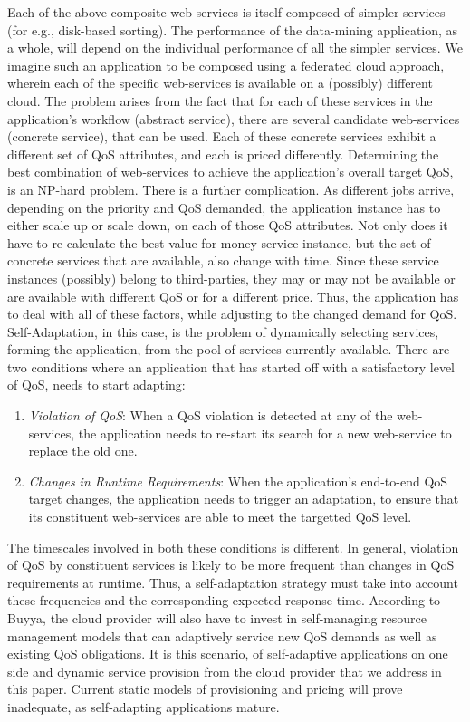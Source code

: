 \documentclass[10pt,journal,compsoc]{IEEEtran}
\begin{document}
Each of the above composite web-services is itself composed of simpler services (for e.g., disk-based sorting). The performance of the data-mining application, as a whole, will depend on the individual performance of all the simpler services. We imagine such an application to be composed using a federated cloud approach, wherein each of the specific web-services is available on a (possibly) different cloud. The problem arises from the fact that for each of these services in the application's workflow (abstract service), there are several candidate web-services (concrete service), that can be used. Each of these concrete services exhibit a different set of QoS attributes, and each is priced differently. Determining the best combination of web-services to achieve the application's overall target QoS, is an NP-hard problem\cite{Ardagna2005Global}. There is a further complication. As different jobs arrive, depending on the priority and QoS demanded, the application instance has to either scale up or scale down, on each of those QoS attributes. Not only does it have to re-calculate the best value-for-money service instance, but the set of concrete services that are available, also change with time. Since these service instances (possibly) belong to third-parties, they may or may not be available or are available with different QoS or for a different price. Thus, the application has to deal with all of these factors, while adjusting to the changed demand for QoS.  Self-Adaptation, in this case, is the problem of dynamically selecting services, forming the application, from the pool of services currently available. There are two conditions where an application that has started off with a satisfactory level of QoS, needs to start adapting:
	\begin{enumerate}
	    \item \textit{Violation of QoS}: When a QoS violation is detected at any of the web-services, the application needs to re-start its search for a new web-service to replace the old one.
	     \item \textit{Changes in Runtime Requirements}: When the application's end-to-end QoS target changes, the application needs to trigger an adaptation, to ensure that its constituent web-services are able to meet the targetted QoS level.
	\end{enumerate} 
The timescales involved in both these conditions is different. In general, violation of QoS by constituent services is likely to be more frequent than changes in QoS requirements at runtime. Thus, a self-adaptation strategy must take into account these frequencies  and the corresponding expected response time.	
According to Buyya, the cloud provider will also have to invest in self-managing resource management models that can adaptively service new QoS demands as well as existing QoS obligations\cite{Buyya2008Market-Oriented}. It is this scenario, of self-adaptive applications on one side and dynamic service provision from the cloud provider that we address in this paper. Current static models of provisioning and pricing will prove inadequate, as self-adapting applications mature.
  
\end{document}

